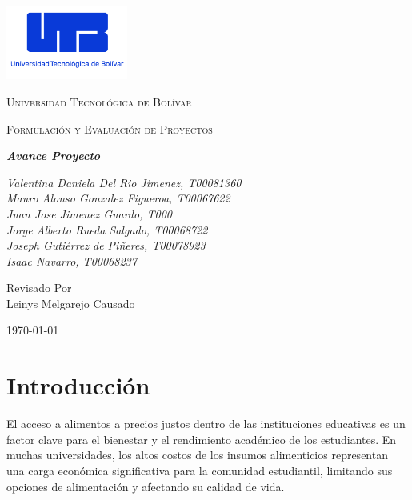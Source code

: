 \documentclass[letterpaper, 11pt]{report}
\begin{document}
\begin{titlepage}
      \centering
      \includegraphics[width=0.3\textwidth]{Images/logo_utb.png}\par\vspace{1cm}
      {\scshape\LARGE Universidad Tecnológica de Bolívar \par}
      \vspace{1cm}

      {\scshape\Large Formulación y Evaluación de Proyectos \par}
      \vspace{1cm}

      \slshape {\Large \bfseries{} Avance Proyecto \\}
      \vspace{2cm}

      \slshape {\itshape{} Valentina Daniela Del Rio Jimenez, T00081360 \\}
      \slshape {\itshape{} Mauro Alonso Gonzalez Figueroa, T00067622 \\}
      \slshape {\itshape{} Juan Jose Jimenez Guardo, T000 \\}
      \slshape {\itshape{} Jorge Alberto Rueda Salgado, T00068722 \\}
      \slshape {\itshape{} Joseph Gutiérrez de Piñeres, T00078923  \\}
      \slshape {\itshape{} Isaac Navarro, T00068237  \\}

      \vfill
      Revisado Por \\
      Leinys Melgarejo Causado\\
      {\large \today\par}
\end{titlepage}

\nocite{*}

\tableofcontents{}
\newpage

\section{Introducción}

El acceso a alimentos a precios justos dentro de las instituciones educativas
es un factor clave para el bienestar y el rendimiento académico de los
estudiantes. En muchas universidades, los altos costos de los insumos
alimenticios representan una carga económica significativa para la comunidad
estudiantil, limitando sus opciones de alimentación y afectando su calidad de
vida.
\end{document}
